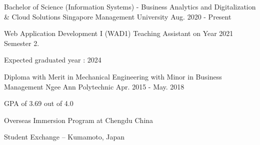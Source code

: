 

\begin{cventries}

    \cventry
    {Bachelor of Science (Information Systems) - Business Analytics and Digitalization \& Cloud Solutions} %
    {Singapore Management University} %
    {Aug. 2020 - Present}%
    {} %
    {
      \begin{cvitems} %
        \item {Web Application Development I (WAD1) Teaching Assistant on Year 2021 Semester 2.}
        \item {Expected graduated year : 2024}
      \end{cvitems}
    }
    \cventry
    {Diploma with Merit in Mechanical Engineering with Minor in Business Management} %
    {Ngee Ann Polytechnic} %
    {Apr. 2015 - May. 2018}%
    {} %
    {
      \begin{cvitems} %
        \item {GPA of 3.69 out of 4.0}
        \item {Overseas Immersion Program at Chengdu China }
        \item {Student Exchange – Kumamoto, Japan }
      \end{cvitems}
    }

\end{cventries}
